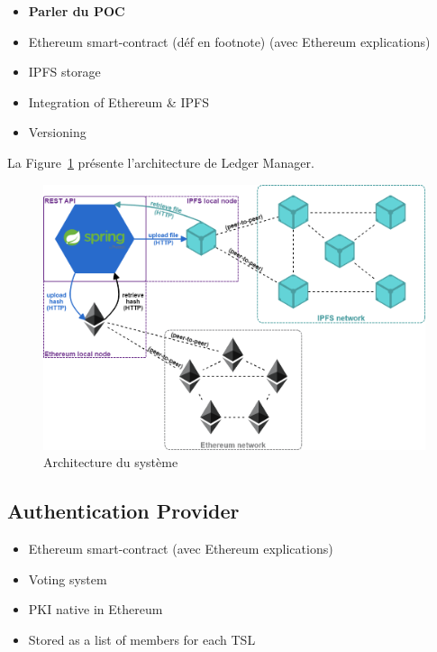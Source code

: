 \documentclass{tnreport}
\begin{document}
\begin{itemize}
	\item \textbf{Parler du POC}
	\item Ethereum smart-contract (déf en footnote) (avec Ethereum explications) %
	\item IPFS storage
	\item Integration of Ethereum \& IPFS
	\item Versioning
\end{itemize}

La Figure~\ref{fig:ledger-architecture} présente l'architecture de Ledger Manager.

\begin{figure}[h]
	\centering
	\includegraphics[scale=0.45]{figures/architecture}
	\caption{Architecture du système}
	\label{fig:ledger-architecture}
\end{figure}

\subsection{Authentication Provider}

\begin{itemize}
	\item Ethereum smart-contract (avec Ethereum explications)
	\item Voting system
	\item PKI native in Ethereum
	\item Stored as a list of members for each TSL
\end{itemize}
\end{document}
